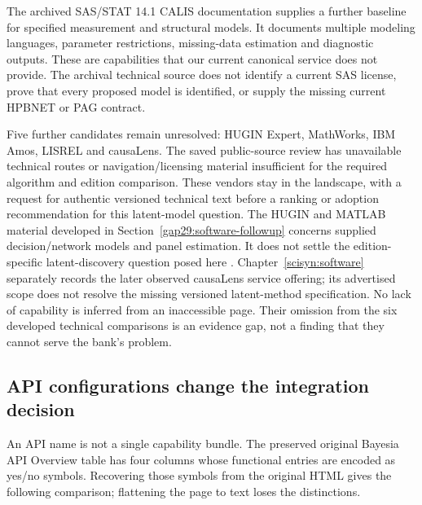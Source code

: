 The archived SAS/STAT 14.1 CALIS documentation supplies a further
baseline for specified measurement and structural models. It documents
multiple modeling languages, parameter restrictions, missing-data
estimation and diagnostic outputs. These are capabilities that our
current canonical service does not provide. The archival technical
source does not identify a current SAS license, prove that every
proposed model is identified, or supply the missing current HPBNET or
PAG contract. \citep{exec13_latent_sas_calis}

Five further candidates remain unresolved: HUGIN Expert, MathWorks, IBM
Amos, LISREL and causaLens. The saved public-source review has
unavailable technical routes or navigation/licensing material
insufficient for the required algorithm and edition comparison. These
vendors stay in the landscape, with a request for authentic versioned
technical text before a ranking or adoption recommendation for this latent-model
question. The HUGIN and MATLAB material developed in
Section~\ref{gap29:software-followup} concerns supplied decision/network
models and panel estimation. It does not settle the edition-specific
latent-discovery question posed here \citep{gap29hugin,gap29matlab}.
Chapter~\ref{scisyn:software} separately records the later observed
causaLens service offering; its advertised scope does not resolve the missing
versioned latent-method specification. No lack of capability is inferred from
an inaccessible page. Their omission from
the six developed technical comparisons is an evidence gap, not a
finding that they cannot serve the bank's problem.

\hypertarget{api-configurations-change-the-integration-decision}{%
\subsection{API configurations change the integration
decision}\label{api-configurations-change-the-integration-decision}}

An API name is not a single capability bundle. The preserved original
Bayesia API Overview table has four columns whose functional entries are
encoded as yes/no symbols. Recovering those symbols from the original
HTML gives the following comparison; flattening the page to text loses
the distinctions. \citep{exec13_bayesia_api}

